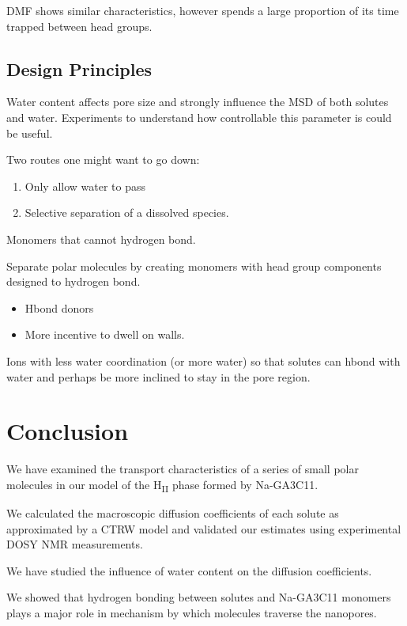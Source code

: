 \documentclass{article}
\begin{document}
  DMF shows similar characteristics, however spends a large proportion of its time trapped 
  between head groups.
  

  \subsection{Design Principles}

  Water content affects pore size and strongly influence the MSD of both solutes and
  water. Experiments to understand how controllable this parameter is could be useful.
  
  Two routes one might want to go down:
  \begin{enumerate}
    \item Only allow water to pass
    \item Selective separation of a dissolved species.
  \end{enumerate}
  
  Monomers that cannot hydrogen bond. %

  Separate polar molecules by creating monomers with head group components designed to
  hydrogen bond.
  \begin{itemize}
  	\item Hbond donors
	\item More incentive to dwell on walls.
  \end{itemize}
  
  Ions with less water coordination (or more water) so that solutes can hbond with water
  and perhaps be more inclined to stay in the pore region.

  \section{Conclusion}

  We have examined the transport characteristics of a series of small polar
  molecules in our model of the H\textsubscript{II} phase formed by 
  Na-GA3C11.

  We calculated the macroscopic diffusion coefficients of each solute as 
  approximated by a CTRW model and validated our estimates using experimental
  DOSY NMR measurements.

  We have studied the influence of water content on the diffusion coefficients.

  We showed that hydrogen bonding between solutes and Na-GA3C11 monomers plays
  a major role in mechanism by which molecules traverse the nanopores. 
\end{document}
